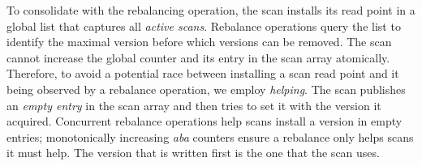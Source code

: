 To consolidate with the rebalancing operation, the scan installs its read point in a global list that captures all \emph{active scans}. Rebalance operations query the list to identify the maximal version before which versions can be removed. The scan cannot increase the global counter and its entry in the scan array atomically. Therefore, to avoid a potential race between installing a scan read point and it being observed by a rebalance operation, we employ \emph{helping}. The scan publishes an \emph{empty entry} in the scan array and then tries to set it with the version it acquired. Concurrent rebalance operations help scans install a version in empty entries; 
monotonically increasing \emph{aba} counters
ensure a rebalance only helps scans it must help.
The version that is written first is the one that the scan uses.


